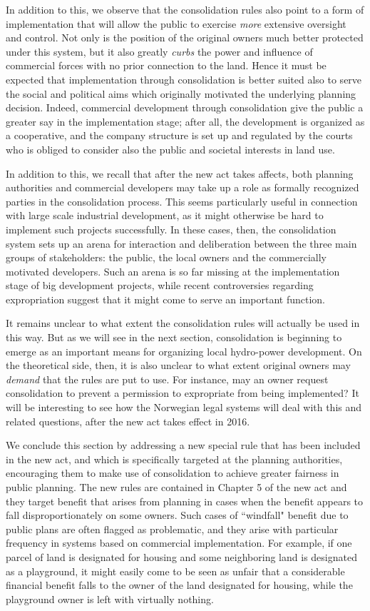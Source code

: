 In addition to this, we observe that the consolidation rules also point to a form of implementation that will allow the public to exercise \emph{more} extensive oversight and control. Not only is the position of the original owners much better protected under this system, but it also greatly \emph{curbs} the power and influence of commercial forces with no prior connection to the land. Hence it must be expected that implementation through consolidation is better suited also to serve the social and political aims which originally motivated the underlying planning decision. Indeed, commercial development through consolidation give the public a greater say in the implementation stage; after all, the development is organized as a cooperative, and the company structure is set up and regulated by the courts who is obliged to consider also the public and societal interests in land use.

In addition to this, we recall that after the new act takes affects, both planning authorities and commercial developers may take up a role as formally recognized parties in the consolidation process. This seems particularly useful in connection with large scale industrial development, as it might otherwise be hard to implement such projects successfully. In these cases, then, the consolidation system sets up an arena for interaction and deliberation between the three main groups of stakeholders: the public, the local owners and the commercially motivated developers. Such an arena is so far missing at the implementation stage of big development projects, while recent controversies regarding expropriation suggest that it might come to serve an important function.

It remains unclear to what extent the consolidation rules will actually be used in this way. But as we will see in the next section, consolidation is beginning to emerge as an important means for organizing local hydro-power development. On the theoretical side, then, it is also unclear to what extent original owners may \emph{demand} that the rules are put to use. For instance, may an owner request consolidation to prevent a permission to expropriate from being implemented? It will be interesting to see how the Norwegian legal systems will deal with this and related questions, after the new act takes effect in 2016.

We conclude this section by addressing a new special rule that has been included in the new act, and which is specifically targeted at the planning authorities, encouraging them to make use of consolidation to achieve  greater fairness in public planning. The new rules are contained in Chapter 5 of the new act and they target benefit that arises from planning in cases when the benefit appears to fall disproportionately on some owners. Such cases of ``windfall" benefit due to public plans are often flagged as problematic, and they arise with particular frequency in systems based on commercial implementation. For example, if one parcel of land is designated for housing and some neighboring land is designated as a playground, it might easily come to be seen as unfair that a considerable financial benefit falls to the owner of the land designated for housing, while the playground owner is left with virtually nothing.

